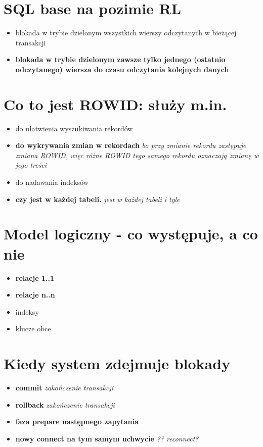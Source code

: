 \documentclass[a4paper,twoside]{article}
\begin{document}
  \section{SQL base na pozimie RL}
      \begin{itemize}
      \item blokada w trybie dzielonym wszystkich wierszy odczytanych w bieżącej transakcji
      \item \textbf{blokada w trybie dzielonym zawsze tylko jednego (ostatnio odczytanego) wiersza do czasu odczytania kolejnych danych}
      \end{itemize}

  \section{Co to jest ROWID: służy m.in.}
      \begin{itemize}
      \item do ułatwienia wyszukiwania rekordów
      \item \textbf{do wykrywania zmian w rekordach} \emph{bo przy zmianie rekordu zastępuje zmiana ROWID, więc różne ROWID tego samego rekordu oznaczają zmianę w jego treści}
      \item  do nadawania indeksów 
      \item \textbf{czy jest w każdej tabeli.} \emph{jest w każdej tabeli i tyle}
      \end{itemize}

  \section{Model logiczny - co występuje, a co nie}
      \begin{itemize}
      \item \textbf{relacje 1..1}
      \item \textbf{relacje n..n}
      \item indeksy
      \item klucze obce
      \end{itemize}

  \section{Kiedy system zdejmuje blokady}
      \begin{itemize}
      \item \textbf{commit} \emph{zakończenie transakcji}
      \item \textbf{rollback} \emph{zakończenie transakcji}
      \item \textbf{faza prepare następnego zapytania}
      \item \textbf{nowy connect na tym samym uchwycie} \emph{?? reconnect?}
      \end{itemize}
\end{document}
